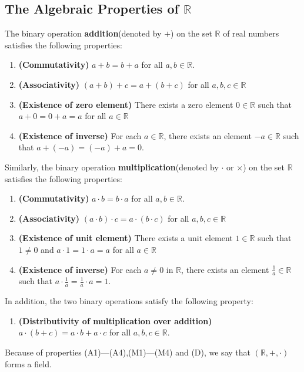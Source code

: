 \documentclass[12pt]{article}
\theoremstyle{definition}
\begin{document}
\subsection{The Algebraic Properties of $\mathbb{R}$}
The binary operation \textbf{addition}(denoted by $+$) on the set $\mathbb{R}$ of real numbers satisfies the following properties:
\begin{enumerate}[label=(A\arabic*)]
\item \textbf{(Commutativity)} $a+b=b+a$ for all $a,b\in\mathbb{R}$.
\item \textbf{(Associativity)} $(a+b)+c=a+(b+c)$ for all $a,b,c\in\mathbb{R}$
\item \textbf{(Existence of zero element)} There exists a zero element $0\in\mathbb{R}$ such that $a+0=0+a=a$ for all $a\in\mathbb{R}$
\item \textbf{(Existence of inverse)} For each $a\in\mathbb{R}$, there exists an element $-a\in\mathbb{R}$ such that $a+(-a)=(-a)+a=0$.
\end{enumerate} 
Similarly, the binary operation \textbf{multiplication}(denoted by $\cdot$ or $\times$) on the set $\mathbb{R}$ satisfies the following properties:
\begin{enumerate}[label=(M\arabic*)]
\item \textbf{(Commutativity)} $a\cdot b=b\cdot a$ for all $a,b\in\mathbb{R}$.
\item \textbf{(Associativity)} $(a\cdot b)\cdot c=a\cdot(b\cdot c)$ for all $a,b,c\in\mathbb{R}$
\item \textbf{(Existence of unit element)} There exists a unit element $1\in\mathbb{R}$ such that $1\neq 0$ and $a\cdot 1=1\cdot a=a$ for all $a\in\mathbb{R}$
\item \textbf{(Existence of inverse)} For each $a\neq 0$ in $\mathbb{R}$, there exists an element $\frac{1}{a}\in\mathbb{R}$ such that $a\cdot\frac{1}{a}=\frac{1}{a}\cdot a=1$.
\end{enumerate} 
In addition, the two binary operations satisfy the following property:
\begin{enumerate}[label=(D)]
\item \textbf{(Distributivity of multiplication over addition)} $a\cdot(b+c)=a\cdot b + a\cdot c$ for all $a,b,c\in\mathbb{R}$.
\end{enumerate}
Because of properties (A1)---(A4),(M1)---(M4) and (D), we say that $(\mathbb{R},+,\cdot)$ forms a field.
\end{document}
